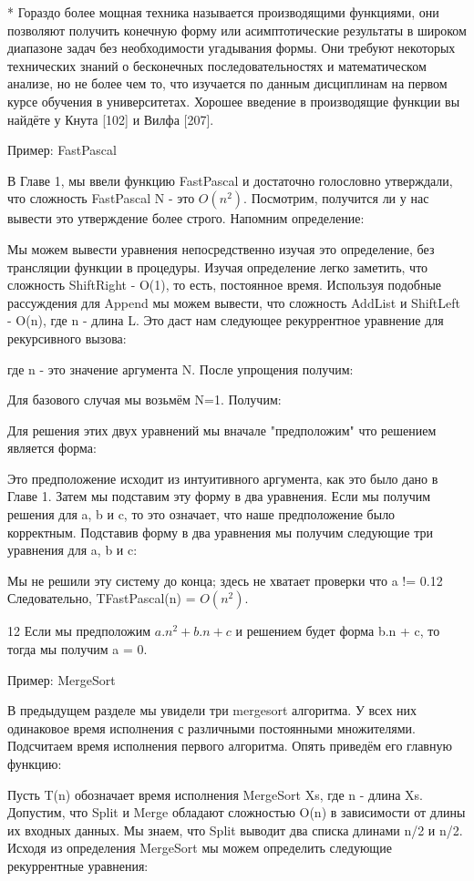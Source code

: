 * Гораздо более мощная техника называется производящими функциями, они позволяют получить конечную форму или асимптотические результаты в широком диапазоне задач без необходимости угадывания формы. Они требуют некоторых технических знаний о бесконечных последовательностях и математическом анализе, но не более чем то, что изучается по данным дисциплинам на первом курсе обучения в университетах. Хорошее введение в производящие функции вы найдёте у Кнута [102] и Вилфа [207].

Пример: FastPascal

В Главе 1, мы ввели функцию FastPascal и достаточно голословно утверждали, что сложность {FastPascal N} - это $O(n^2)$. Посмотрим, получится ли у нас вывести это утверждение более строго. Напомним определение:

Мы можем вывести уравнения непосредственно изучая это определение, без трансляции функции в процедуры. Изучая определение легко заметить, что сложность ShiftRight - O(1), то есть, постоянное время. Используя подобные рассуждения для Append мы можем вывести, что сложность AddList и ShiftLeft - O(n), где n - длина L. Это даст нам следующее рекуррентное уравнение для рекурсивного вызова:

где n - это значение аргумента N. После упрощения получим:

Для базового случая мы возьмём N=1. Получим:

Для решения этих двух уравнений мы вначале "предположим" что решением является форма:

Это предположение исходит из интуитивного аргумента, как это было дано в Главе 1. Затем мы подставим эту форму в два уравнения. Если мы получим решения для a, b и c, то это означает, что наше предположение было корректным. Подставив форму в два уравнения мы получим следующие три уравнения для a, b и c:

Мы не решили эту систему до конца; здесь не хватает проверки что a != 0.12 Следовательно, TFastPascal(n) = $O(n^2)$.

12 Если мы предположим $a.n^2 + b.n + c$ и решением будет форма b.n + c, то тогда мы получим a = 0.

Пример: MergeSort

В предыдущем разделе мы увидели три mergesort алгоритма. У всех них одинаковое время исполнения с различными постоянными множителями. Подсчитаем время исполнения первого алгоритма. Опять приведём его главную функцию:

Пусть T(n) обозначает время исполнения {MergeSort Xs}, где n - длина Xs. Допустим, что Split и Merge обладают сложностью O(n) в зависимости от длины их входных данных. Мы знаем, что Split выводит два списка длинами n/2 и n/2. Исходя из определения MergeSort мы можем определить следующие рекуррентные уравнения:

